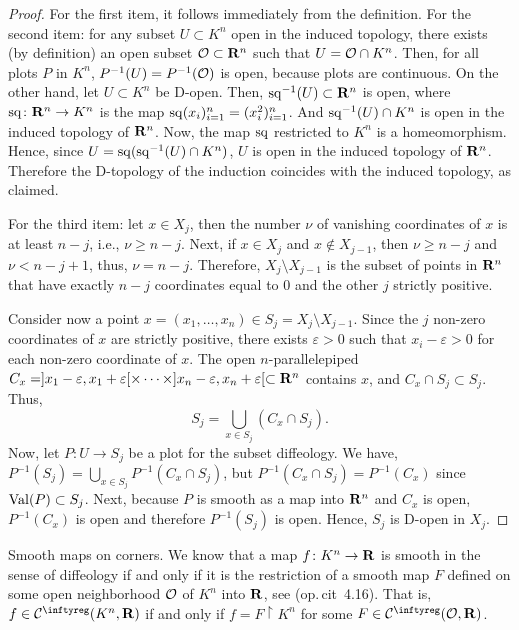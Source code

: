 \begin{proof}
  For the first item,
  it follows immediately from the definition.
  For the second item:
  for any subset $U \subset K^n$ open in the induced topology,
  there exists (by definition) an open subset $\mathcal{O} \subset \mathbf{R}^n$ such that $U = \mathcal{O} \cap K^n$.
  Then,
  for all plots $P$ in $K^n$,
  $P^{-1}(U) = P^{-1}(\mathcal{O})$ is open,
  because plots are continuous.
  On the other hand,
  let $U \subset K^n$ be D-open.
  Then,
  ${\operatorname{sq}}^{-1}(U) \subset \mathbf{R}^n$ is open,
  where ${\operatorname{sq}} \colon \mathbf{R}^n \to K^n$ is the map ${\operatorname{sq}}(x_i)_{i=1}^n = (x_i^2)_{i=1}^n$.
  And ${\operatorname{sq}}^{-1}(U) \cap K^n$ is open in the induced topology of $\mathbf{R}^n$.
  Now,
  the map ${\operatorname{sq}}$ restricted to $K^n$ is a homeomorphism.
  Hence,
  since $U = {\operatorname{sq}}({\operatorname{sq}}^{-1}(U) \cap K^n)$,
  $U$ is open in the induced topology of $\mathbf{R}^n$.
  Therefore the D-topology of the induction coincides with the induced topology,
  as claimed.
  
  For the third item:
  let $x \in X_j$,
  then the number $\nu$ of vanishing coordinates of $x$ is at least $n-j$,
  i.e., $\nu \geq n-j$.
  Next,
  if $x \in X_j$ and $x \notin X_{j-1}$,
  then $\nu \geq n-j$ and $\nu < n-j+1$,
  thus,
  $\nu = n-j$.
  Therefore,
  $X_j \setminus X_{j-1}$ is the subset of points in $\mathbf{R}^n$ that have exactly $n-j$ coordinates equal to $0$ and the other $j$ strictly positive.
  
  Consider now a point $x = (x_1,\dots,x_n) \in S_j = X_j \setminus X_{j-1}$.
  Since the $j$ non-zero coordinates of $x$ are strictly positive,
  there exists $\varepsilon > 0$ such that $x_i - \varepsilon > 0$ for each non-zero coordinate of $x$.
  The open $n$-parallelepiped $C_x = ]x_1-\varepsilon,x_1+\varepsilon[ \times \dots \times ]x_n-\varepsilon,x_n+\varepsilon[ \subset \mathbf{R}^n$ contains $x$,
  and $C_x \cap S_j \subset S_j$.
  Thus,
  $$%
    S_j = \bigcup_{x \in S_j} (C_x \cap S_j).
  $$%
  Now,
  let $P : U \to S_j$ be a plot for the subset diffeology.
  We have,
  $P^{-1}(S_j) = \bigcup_{x \in S_j} P^{-1}(C_x \cap S_j)$,
  but $P^{-1}(C_x \cap S_j) = P^{-1}(C_x)$ since $\operatorname{Val}(P) \subset S_j$.
  Next,
  because $P$ is smooth as a map into $\mathbf{R}^n$ and $C_x$ is open,
  $P^{-1}(C_x)$ is open and therefore $P^{-1}(S_j)$ is open.
  Hence,
  $S_j$ is D-open in $X_j$.
\end{proof}

\begin{Article}{Smooth maps on corners.}{}
  \label{Smooth-Maps-on-Corners}
  We know that a map $f \colon K^n \to \mathbf{R}$
  is smooth in the sense of diffeology
  if and only if it is the restriction of a smooth map $F$ defined on some open neighborhood $\mathcal{O}$ of $K^n$ into $\mathbf{R}$,
  see (op.\,cit \textsection\,4.16).
  That is,
  $f \in \Cinfty(K^n,\RR)$ if and only if
  $f = F \restriction K^n$ for some $F \in \Cinfty(\cO, \RR)$.
\end{Article}

